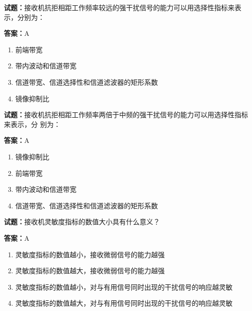 \documentclass{ctexbook}
\begin{document}




\vspace{1em}

\textbf{试题：}接收机抗拒相距工作频率较远的强干扰信号的能力可以用选择性指标来表示，分别为： 

\textbf{答案：}A 

\begin{enumerate}[leftmargin=3em]
  \item 前端带宽 

  \item 带内波动和信道带宽 

  \item 信道带宽、信道选择性和信道滤波器的矩形系数 

  \item 镜像抑制比 

\end{enumerate}





\vspace{1em}

\textbf{试题：}接收机抗拒相距工作频率两倍于中频的强干扰信号的能力可以用选择性指标来表示，分
别为： 

\textbf{答案：}A 

\begin{enumerate}[leftmargin=3em]
  \item 镜像抑制比 

  \item 前端带宽 

  \item 带内波动和信道带宽 

  \item 信道带宽、信道选择性和信道滤波器的矩形系数 

\end{enumerate}





\vspace{1em}

\textbf{试题：}接收机灵敏度指标的数值大小具有什么意义？ 

\textbf{答案：}A 

\begin{enumerate}[leftmargin=3em]
  \item 灵敏度指标的数值越小，接收微弱信号的能力越强 

  \item 灵敏度指标的数值越大，接收微弱信号的能力越强 

  \item 灵敏度指标的数值越小，对与有用信号同时出现的干扰信号的响应越灵敏 

  \item 灵敏度指标的数值越大，对与有用信号同时出现的干扰信号的响应越灵敏 

\end{enumerate}
\end{document}
